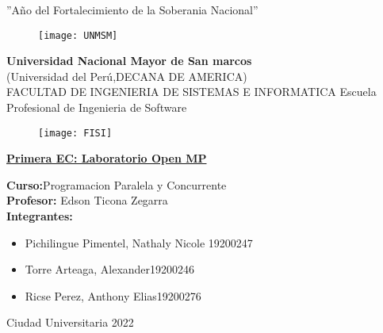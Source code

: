 \documentclass[12pt, letterpaper]{article}
\begin{document}
\begin{center}
    ''Año del Fortalecimiento de la Soberania Nacional''
    \vspace{5mm}
    \begin{figure}[h]
        \centering
        \texttt{[image: UNMSM]}
    \end{figure}

    \textbf{Universidad Nacional Mayor de San marcos} \\
    (Universidad del Perú,DECANA DE AMERICA)\\
    \vspace{5mm}
    FACULTAD DE INGENIERIA DE SISTEMAS E INFORMATICA
    Escuela Profesional de Ingenieria de Software
    \begin{figure}[h]
        \centering   
        \texttt{[image: FISI]}   
    \end{figure}

\textbf{\underline{Primera EC: Laboratorio Open MP}}

    \begin{flushleft}
    \textbf{Curso:}Programacion Paralela y Concurrente\\
    \vspace{2mm}
    \textbf{Profesor:} Edson Ticona Zegarra\\
    \vspace{2mm}
    \textbf{Integrantes:} 
    \begin{itemize}
        \item Pichilingue Pimentel, Nathaly Nicole\hspace{1cm} 19200247
        \item Torre Arteaga, Alexander\hspace{3.2cm}19200246
        \item Ricse Perez, Anthony Elias\hspace{3cm}19200276
    \end{itemize}
    \end{flushleft}

    Ciudad Universitaria 2022
 
\end{center}
\end{document}
